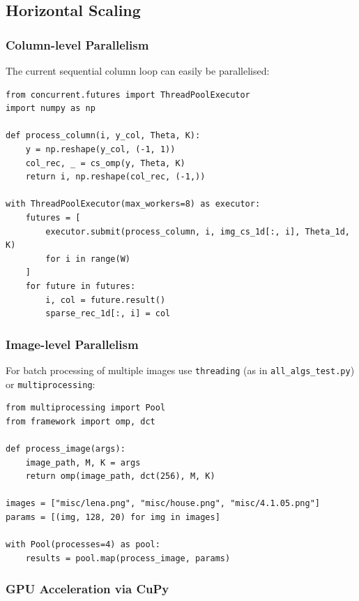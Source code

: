 \documentclass[12pt,a4paper]{article}
\newcommand{\cs}[1]{\texttt{#1}}          %
\begin{document}
\subsection{Horizontal Scaling}

\subsubsection{Column-level Parallelism}

The current sequential column loop can easily be parallelised:

\begin{lstlisting}[style=python]
from concurrent.futures import ThreadPoolExecutor
import numpy as np

def process_column(i, y_col, Theta, K):
    y = np.reshape(y_col, (-1, 1))
    col_rec, _ = cs_omp(y, Theta, K)
    return i, np.reshape(col_rec, (-1,))

with ThreadPoolExecutor(max_workers=8) as executor:
    futures = [
        executor.submit(process_column, i, img_cs_1d[:, i], Theta_1d, K)
        for i in range(W)
    ]
    for future in futures:
        i, col = future.result()
        sparse_rec_1d[:, i] = col
\end{lstlisting}

\subsubsection{Image-level Parallelism}

For batch processing of multiple images use \cs{threading} (as in
\cs{all\_algs\_test.py}) or \cs{multiprocessing}:

\begin{lstlisting}[style=python]
from multiprocessing import Pool
from framework import omp, dct

def process_image(args):
    image_path, M, K = args
    return omp(image_path, dct(256), M, K)

images = ["misc/lena.png", "misc/house.png", "misc/4.1.05.png"]
params = [(img, 128, 20) for img in images]

with Pool(processes=4) as pool:
    results = pool.map(process_image, params)
\end{lstlisting}

\subsubsection{GPU Acceleration via CuPy}
\end{document}
